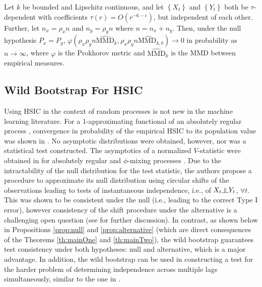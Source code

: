\begin{proposition}\label{prop:mmd}
 Let $k$ be bounded and Lipschitz continuous, and let $\left\{ X_t \right\}$ and $\left\{ Y_t \right\}$ 
 both be $\tau$-dependent with coefficients $\tau(r) =  O(r^{-6-\epsilon})$, but independent of each other. Further, let $n_x=\rho_x n$ and $n_y=\rho_y n$ where $n=n_x+n_y$. Then, under the null hypothesis $P_x=P_y$, $\varphi\left(\rho_x \rho_y n\widehat{\text{MMD}}_k, \rho_x \rho_y n\widehat{\text{MMD}}_{k,b}\right)\to 0$ in probability as $n\to\infty$, where $\varphi$ is the Prokhorov metric and $\widehat{\text{MMD}}_k$ is the MMD between empirical measures.
\end{proposition}



\subsection{Wild Bootstrap For HSIC}\label{sec:hsic}

Using HSIC in the context of random processes is not new in the machine learning literature. For a 1-approximating functional of an absolutely regular process \cite{borovkova2001limit}, convergence in probability of the empirical HSIC to its population value was shown in \cite{smola_kernel_2008}. No asymptotic distributions were obtained, however, nor was a statistical test constructed.  The asymptotics of a normalized $V$-statistic were obtained in \cite{chwialkowski2014kernel}  for absolutely regular and $\phi$-mixing processes \cite{doukhan1994mixing}. Due to the intractability of the null distribution for the test statistic, the authors propose a procedure to approximate its null distribution using circular shifts of the observations leading to tests of instantaneous independence, i.e., of $X_t \indep Y_t$, $\forall t$. This was shown to be consistent under the null (i.e., leading to the correct Type I error), however consistency of the shift procedure under the alternative is a challenging open question (see \cite[Section A.2]{chwialkowski2014kernel} for further discussion).
 In contrast, as shown below in Propositions \ref{prop:null} and \ref{prop:alternative} (which are direct consequences of the Theorems \ref{th:mainOne} and \ref{th:mainTwo}), the wild bootstrap guarantees test consistency under both hypotheses: null and alternative, which is a major advantage. 
In addition,  the wild bootstrap can be used in constructing a test for the harder problem of determining independence across multiple lags simultaneously, similar to the one in \cite{besserve_statistical_2013}.

